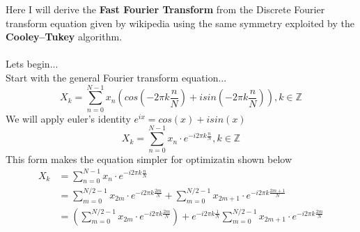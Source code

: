 \documentclass{article}
\begin{document}
Here I will derive the \textbf{Fast Fourier Transform} from the Discrete Fourier transform equation given by wikipedia using the same symmetry exploited by the \textbf{Cooley–Tukey} algorithm. \\ \\
Lets begin... \\
%
Start with the general Fourier transform equation...
$$X_k = \sum_{n=0}^{N-1}x_n(cos(-2\pi k \frac{n}{N}) + i sin(-2\pi k \frac{n}{N})), k \in \mathbb{Z}$$
We will apply euler's identity $e^{ix} = cos(x) + i sin(x)$ \\
$$X_k = \sum_{n=0}^{N-1}x_n \cdot e^{-i2\pi k \frac{n}{N}}, k \in \mathbb{Z}$$
This form makes the equation simpler for optimizatin shown below \\

\begin{align*}
X_k &= \sum_{n=0}^{N-1}x_n \cdot e^{-i2\pi k \frac{n}{N}} \\
&= \sum_{m=0}^{N/2-1}x_{2m} \cdot e^{-i2\pi k \frac{2m}{N}} + \sum_{m=0}^{N/2-1}x_{2m+1} \cdot e^{-i2\pi k \frac{2m+1}{N}} \\
&= (\sum_{m=0}^{N/2-1}x_{2m} \cdot e^{-i2\pi k \frac{2m}{N}}) + e^{-i2\pi k \frac{1}{N}} \sum_{m=0}^{N/2-1}x_{2m+1} \cdot e^{-i2\pi k \frac{2m}{N}} \\
\end{align*}
\end{document}

